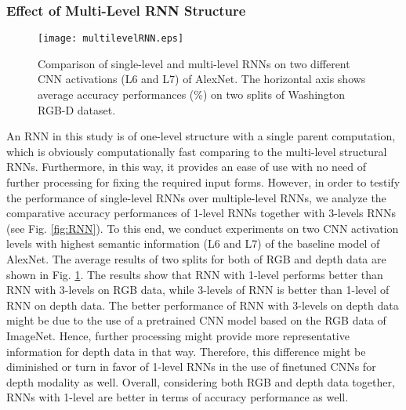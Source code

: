 \documentclass[10pt,journal,compsoc]{IEEEtran}
\begin{document}
\subsubsection{Effect of Multi-Level RNN Structure} \label{sec.exp.ma.multilevelRNN}
\begin{figure}
	\centering
	\texttt{[image: multilevelRNN.eps]}
	\caption{Comparison of single-level and multi-level RNNs on two different CNN activations (L6 and L7) of AlexNet. The horizontal axis shows average accuracy performances (\%) on two splits of Washington RGB-D dataset.}
	\label{fig:multilevelRNN}
\end{figure}
An RNN in this study is of one-level structure with a single parent computation, which is obviously computationally fast comparing to the multi-level structural RNNs. Furthermore, in this way, it provides an ease of use with no need of further processing for fixing the required input forms. However, in order to testify the performance of single-level RNNs over multiple-level RNNs, we analyze the comparative accuracy performances of 1-level RNNs together with 3-levels RNNs (see Fig. \ref{fig:RNN}). To this end, we conduct experiments on two CNN activation levels with highest semantic information (L6 and L7) of the baseline model of AlexNet. The average results of two splits for both of RGB and depth data are shown in Fig. \ref{fig:multilevelRNN}. The results show that RNN with 1-level performs better than RNN with 3-levels on RGB data, while 3-levels of RNN is better than 1-level of RNN on depth data. The better performance of RNN with 3-levels on depth data might be due to the use of a pretrained CNN model based on the RGB data of ImageNet. Hence, further processing might provide more representative information for depth data in that way. Therefore, this difference might be diminished or turn in favor of 1-level RNNs in the use of finetuned CNNs for depth modality as well. Overall, considering both RGB and depth data together, RNNs with 1-level are better in terms of accuracy performance as well.
\end{document}
